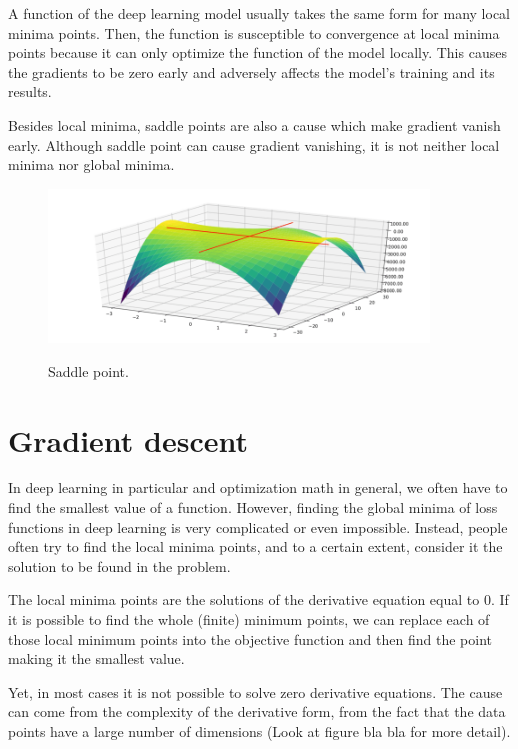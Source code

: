 	A function of the deep learning model usually takes the same form for many local minima points. Then, the function is susceptible to convergence at local minima points because it can only optimize the function of the model locally. This causes the gradients to be zero early and adversely affects the model's training and its results.
	
	Besides local minima, saddle points are also a cause which make gradient vanish early. Although saddle point can cause gradient vanishing, it is not neither local minima nor global minima. 
	
	\begin{figure}[H]
		\centering
		{\includegraphics[width=0.9\textwidth]{./hinhanh/chap3/saddle.png}}
		\caption{Saddle point.}
	\end{figure}
	
	
\section{Gradient descent}
	\label{section:GD}
	\noindent
	
	In deep learning in particular and optimization math in general, we often have to find the smallest value of a function. However, finding the global minima of loss functions in deep learning is very complicated or even impossible. Instead, people often try to find the local minima points, and to a certain extent, consider it the solution to be found in the problem.
	
	The local minima points are the solutions of the derivative equation equal to 0. If it is possible to find the whole (finite) minimum points, we can replace each of those local minimum points into the objective function and then find the point making it the smallest value. 
	
	Yet, in most cases it is not possible to solve zero derivative equations. The cause can come from the complexity of the derivative form, from the fact that the data points have a large number of dimensions (Look at figure bla bla for more detail).
	
